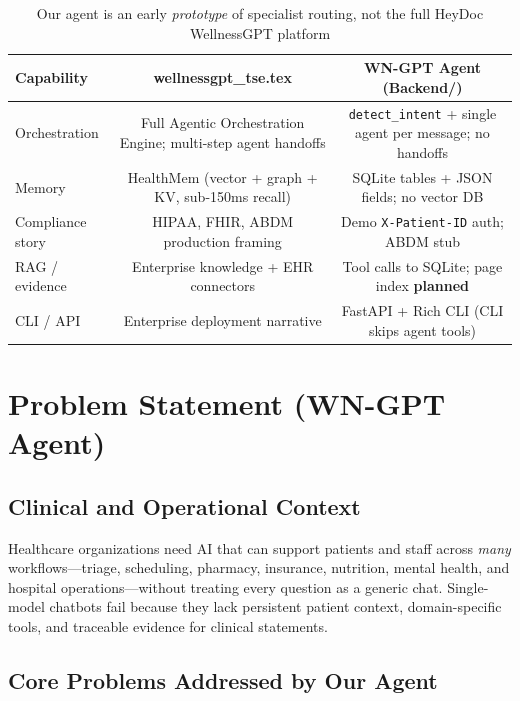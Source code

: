 \documentclass[12pt,a4paper]{article}
\begin{document}
\begin{table}[H]
\centering
\renewcommand{\arraystretch}{1.35}
\begin{tabularx}{\textwidth}{lcc}
\toprule
\textbf{Capability} & \textbf{wellnessgpt\_tse.tex} & \textbf{WN-GPT Agent (Backend/)} \\
\midrule
Orchestration & Full Agentic Orchestration Engine; multi-step agent handoffs & \texttt{detect\_intent} + single agent per message; no handoffs \\
Memory & HealthMem (vector + graph + KV, sub-150ms recall) & SQLite tables + JSON fields; no vector DB \\
Compliance story & HIPAA, FHIR, ABDM production framing & Demo \texttt{X-Patient-ID} auth; ABDM stub \\
RAG / evidence & Enterprise knowledge + EHR connectors & Tool calls to SQLite; page index \textbf{planned} \\
CLI / API & Enterprise deployment narrative & FastAPI + Rich CLI (CLI skips agent tools) \\
\bottomrule
\end{tabularx}
\caption{Our agent is an early \emph{prototype} of specialist routing, not the full HeyDoc WellnessGPT platform}
\end{table}

\newpage

\section{Problem Statement (WN-GPT Agent)}

\subsection{Clinical and Operational Context}

Healthcare organizations need AI that can support patients and staff across \emph{many} workflows---triage, scheduling, pharmacy, insurance, nutrition, mental health, and hospital operations---without treating every question as a generic chat. Single-model chatbots fail because they lack persistent patient context, domain-specific tools, and traceable evidence for clinical statements.

\subsection{Core Problems Addressed by Our Agent}
\end{document}
